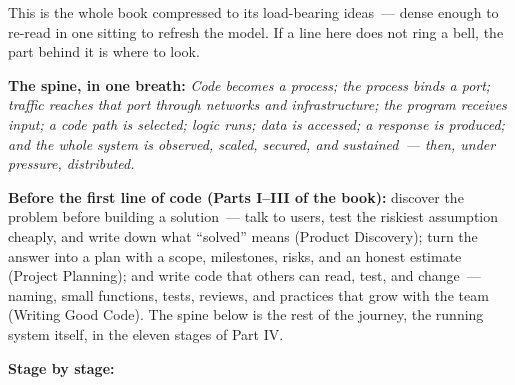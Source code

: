 \label{ch:44-appendices-6}

\chapterrule

This is the whole book compressed to its load-bearing ideas~--- dense enough to re-read in one sitting to refresh the model. If a line here does not ring a bell, the part behind it is where to look.

\textbf{The spine, in one breath:} \emph{Code becomes a process; the process binds a port; traffic reaches that port through networks and infrastructure; the program receives input; a code path is selected; logic runs; data is accessed; a response is produced; and the whole system is observed, scaled, secured, and sustained~--- then, under pressure, distributed.}

\textbf{Before the first line of code (Parts I--III of the book):} discover the problem before building a solution~--- talk to users, test the riskiest assumption cheaply, and write down what ``solved'' means (Product Discovery); turn the answer into a plan with a scope, milestones, risks, and an honest estimate (Project Planning); and write code that others can read, test, and change~--- naming, small functions, tests, reviews, and practices that grow with the team (Writing Good Code). The spine below is the rest of the journey, the running system itself, in the eleven stages of Part IV.

\textbf{Stage by stage:}

